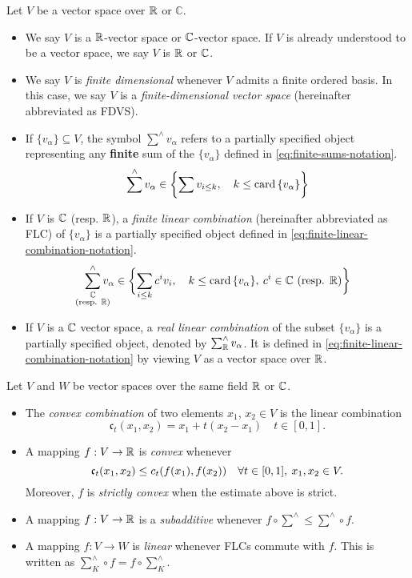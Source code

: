 \documentclass[../main-v2-manifolds.tex]{subfiles}
\begin{document}
Let $V$ be a vector space over $\mathbb{R}$ or $\mathbb{C}$. 
\begin{itemize}
    \item We say $V$ is a $\mathbb{R}$-vector space or ${\mathbb{C}}$-vector space. If $V$ is already understood to be a vector space, we say $V$ is $\mathbb{R}$ or ${\mathbb{C}}$.
    \item We say $V$ is \emph{finite dimensional} whenever $V$ admits a finite ordered basis. In this case, we say $V$ is a \emph{finite-dimensional vector space} (hereinafter abbreviated as FDVS).
    \item If $\{v_{\alpha}\}\subseteq V$, the symbol $\sum^{\wedge}v_\alpha$ refers to a partially specified object representing any \textbf{finite} sum of the $\{v_{\alpha}\}$ defined in \cref{eq:finite-sums-notation}.
    \begin{equation}\label{eq:finite-sums-notation}
    \sum^\wedge v_{\alpha} \in\biggl\{{\sum v_{i\leq k},\quad k\leq \operatorname{card}{\{v_\alpha\}}}\biggr\}
    \end{equation}
    \item If $V$ is ${\mathbb{C}}$ (resp. $\mathbb{R}$), a \emph{finite linear combination} (hereinafter abbreviated as FLC) of $\{v_\alpha\}$ is a partially specified object defined in \cref{eq:finite-linear-combination-notation}.
    \begin{equation}
        \sum^\wedge_{\mathclap{\substack{\complex\\(\text{resp. }\real)}}}v_\alpha \in\bigset{\sum_{i\leq k}c^iv_i,\quad k\leq\card{\{v_\alpha\}},\: c^i\in\complex \text{ (resp. }\real\text{)}}
        \label{eq:finite-linear-combination-notation}
    \end{equation}
    \item If $V$ is a ${\mathbb{C}}$ vector space, a \emph{real linear combination} of the subset $\{v_{\alpha}\}$ is a partially specified object, denoted by $\sum^\wedge_{\mathbb{R}} v_{\alpha}$. It is defined in \cref{eq:finite-linear-combination-notation} by viewing $V$ as a vector space over $\mathbb{R}$.
    \end{itemize}
    Let $V$ and $W$ be vector spaces over the same field $\mathbb{R}$ or ${\mathbb{C}}$.
    \begin{itemize}
    \item The \emph{convex combination} of two elements $x_1$, $x_2\in V$ is the linear combination 
    \[
        \mathfrak{c}_t(x_1, x_2) = x_1 + t(x_2 - x_1) \quad t\in [0,1].
    \]
    \item A mapping $f: V\to \mathbb{R}$ is \emph{convex} whenever 
    \[
        \mathfrak{c}_t(x_1, x_2)\leq c_t\qty(f(x_1),f(x_2))\quad\forall t\in[0,1],\: x_1,x_2\in V.
    \]
    Moreover, $f$ is \emph{strictly convex} when the estimate above is strict.
    \item A mapping $f: V\to \mathbb{R}$ is a \emph{subadditive} whenever $f\circ\sum^\wedge\leq \sum^\wedge\circ f$.
    \item A mapping $f: V\to W$ is \emph{linear} whenever FLCs commute with $f$. This is written as $\sum^\wedge_K \circ f = f\circ \sum^\wedge_K$.
\end{itemize}
\end{document}
